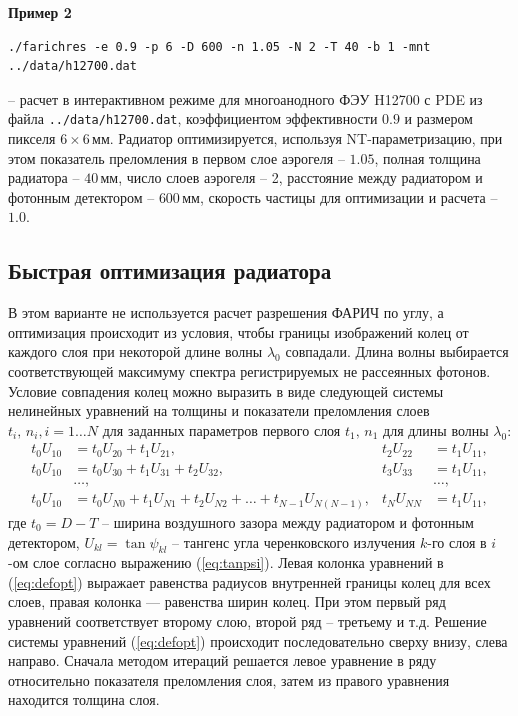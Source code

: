 \documentclass[12pt]{article}
\begin{document}
\pagebreak
\textbf{Пример 2}
{\small
\begin{verbatim}
./farichres -e 0.9 -p 6 -D 600 -n 1.05 -N 2 -T 40 -b 1 -mnt ../data/h12700.dat
\end{verbatim}}
\noindent
-- расчет в интерактивном режиме для многоанодного ФЭУ H12700 с PDE из файла \texttt{../data/h12700.dat},
коэффициентом эффективности $0.9$ и размером пикселя $6\times 6$\,мм. 
Радиатор оптимизируется, используя NT-параметризацию, при этом показатель преломления в первом слое аэрогеля -- $1.05$, полная толщина радиатора -- $40$\,мм, число слоев аэрогеля -- 2, расстояние между радиатором и фотонным детектором -- $600$\,мм, скорость частицы для оптимизации и расчета -- $1.0$.

\subsection{Быстрая оптимизация радиатора}
\label{ss:defopt}
В этом варианте не используется расчет разрешения ФАРИЧ по углу, а оптимизация происходит из условия, чтобы границы изображений колец от каждого слоя при 
некоторой длине волны $\lambda_0$ совпадали. Длина волны выбирается соответствующей максимуму спектра регистрируемых не рассеянных фотонов.
Условие совпадения колец можно выразить в виде следующей системы нелинейных уравнений на толщины и показатели преломления слоев $t_i,\,n_i, i=1\ldots N$ для заданных
параметров первого слоя $t_1,\,n_1$ для длины волны $\lambda_0$:
\begin{align}\label{eq:defopt}
t_0 U_{10} & = t_0 U_{20} + t_1 U_{21},              & t_2 U_{22} & = t_1 U_{11}, \nonumber\\
t_0 U_{10} & = t_0 U_{30} + t_1 U_{31} + t_2 U_{32}, & t_3 U_{33} & = t_1 U_{11}, \nonumber\\
& \ldots, & & \ldots, \\
t_0 U_{10} & = t_0 U_{N0} + t_1 U_{N1} + t_2 U_{N2} + \ldots + t_{N-1} U_{N(N-1)}, & t_N U_{NN} & = t_1 U_{11}, \nonumber
\end{align}
где $t_0=D-T$ -- ширина воздушного зазора между радиатором и фотонным детектором, $U_{kl} = \tan\psi_{kl}$ -- тангенс угла черенковского излучения $k$-го слоя в $i$-ом слое
согласно выражению (\ref{eq:tanpsi}). Левая колонка уравнений в (\ref{eq:defopt}) выражает равенства радиусов внутренней границы колец для всех слоев, правая колонка --- равенства
ширин колец. При этом первый ряд уравнений соответствует второму слою, второй ряд -- третьему и т.д. Решение системы уравнений (\ref{eq:defopt}) происходит последовательно 
сверху внизу, слева направо. Сначала методом итераций решается левое уравнение в ряду относительно показателя преломления слоя, затем из правого уравнения находится толщина слоя.
\end{document}
